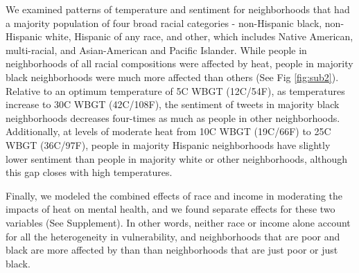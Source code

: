 \documentclass[fleqn,10pt]{wlscirep}
\begin{document}
We examined patterns of temperature and sentiment for neighborhoods that had a majority population of four broad racial categories - non-Hispanic black, non-Hispanic white, Hispanic of any race, and other, which includes Native American, multi-racial, and Asian-American and Pacific Islander.  While people in neighborhoods of all racial compositions were affected by heat, people in majority black neighborhoods were much more affected than others  (See Fig \ref{fig:sub2}).  Relative to an optimum temperature of 5\textdegree C WBGT (12\textdegree C/54\textdegree F), as temperatures increase to 30\textdegree C WBGT (42\textdegree C/108\textdegree F), the sentiment of tweets in majority black neighborhoods decreases four-times as much as people in other neighborhoods.  Additionally, at levels of moderate heat from 10\textdegree C WBGT (19\textdegree C/66\textdegree F) to 25\textdegree C WBGT (36\textdegree C/97\textdegree F), people in majority Hispanic neighborhoods have slightly lower sentiment than people in majority white or other neighborhoods, although this gap closes with high temperatures.

Finally, we modeled the combined effects of race and income in moderating the impacts of heat on mental health, and we found separate effects for these two variables (See Supplement).  In other words, neither race or income alone account for all the heterogeneity in vulnerability, and neighborhoods that are poor and black are more affected by than than neighborhoods that are just poor or just black.
\end{document}
